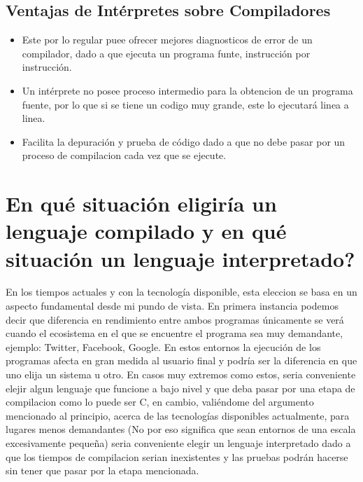 \documentclass{article}
\begin{document}
\subsection{Ventajas de Int\'erpretes sobre Compiladores}\cite{comppth} \cite{comintp}
\begin{itemize}
\item Este por lo regular puee ofrecer mejores diagnosticos de error de un compilador, dado a que ejecuta un programa funte, instrucci\'on por instrucci\'on.
\item Un int\'erprete no posee proceso intermedio para la obtencion de un programa fuente, por lo que si se tiene un codigo muy grande, este lo ejecutar\'a linea a linea.
\item Facilita la depuraci\'on y prueba de c\'odigo dado a que no debe pasar por un proceso de compilacion cada vez que se ejecute.
\end{itemize}

\section{{\textquestiondown}En qu\'e situaci\'on eligir\'ia un lenguaje compilado y en qu\'e situaci\'on un lenguaje interpretado?}

En los tiempos actuales y con la tecnolog\'ia disponible, esta eleccion se basa en un aspecto fundamental desde mi pundo de vista. En primera instancia podemos decir que diferencia en rendimiento entre ambos programas \'unicamente se ver\'a cuando el ecosistema en el que se encuentre el programa sea muy demandante, ejemplo: Twitter, Facebook, Google. En estos entornos la ejecuci\'on de los programas afecta en gran medida al usuario final y podr\'ia ser la diferencia en que uno elija un sistema u otro. En casos muy extremos como estos, seria conveniente elejir algun lenguaje que funcione a bajo nivel y que deba pasar por una etapa de compilacion como lo puede ser C, en cambio, vali\'endome del argumento mencionado al principio, acerca de las tecnolog\'ias disponibles actualmente, para lugares menos demandantes (No por eso significa que sean entornos de una escala excesivamente peque\~{n}a) seria conveniente elegir un lenguaje interpretado dado a que los tiempos de compilacion serian inexistentes y las pruebas podr\'an hacerse sin tener que pasar por la etapa mencionada.
\end{document}
